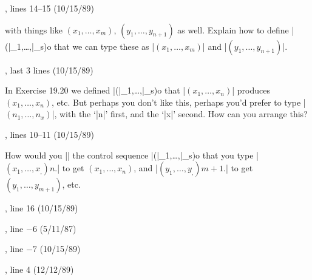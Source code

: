 
, lines 14--15 (10/15/89)

\def\vector#1#2{(#1_1,\dots,#1_{#2})}
\begingroup
{}
\noindent
with things like $\vector xm$,
$\vector y{n+1}$ as well.  Explain how to define |\vector| so that we can
type these as |$\vector xm$| and |$\vector y{n+1}$|.

\endgroup

, last 3 lines (10/15/89)

\noindent
In Exercise 19.20 we defined |\vector| so that
|$\vector xn$| produces $\vector xn$, etc.  But perhaps you don't like this, 
perhaps you'd prefer to type |$\vector nx$|, with the `|n|'
first, and the `|x|' second.  How can you arrange this?

, lines 10--11 (10/15/89)

\begingroup
\noindent
How would you || the control sequence |\vector| so that
you type |$\vector x,n.$| to get $\vector xn$, and |$\vector y,m+1.$| to get
$\vector y{m+1}$, etc.

\endgroup

, line 16 (10/15/89)


, line $-6$ (5/11/87)


, line $-7$ (10/15/89)


, line 4 (12/12/89)


%

%

